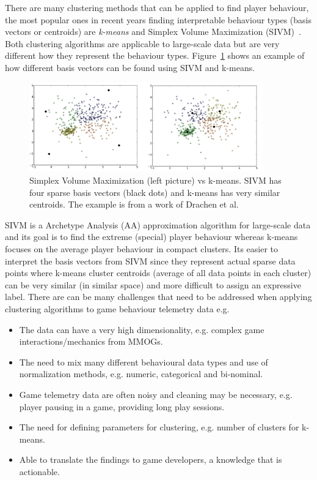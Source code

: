 There are many clustering methods that can be applied to find player behaviour, the most popular ones in recent years finding interpretable behaviour types (basis vectors or centroids) are \textit{k-means} and Simplex Volume Maximization (SIVM)~\citep{Drachen:2012, Drachen:2013}. Both clustering algorithms are applicable to large-scale data but are very different how they represent the behaviour types. Figure~\ref{fig:SIVMvsKmeans} shows an example of how different basis vectors can be found using SIVM and k-means.
\begin{figure}[here]
\centerline{\includegraphics[width=0.9\textwidth]{Figures/SIVMvsKmeans.png}}
\caption{Simplex Volume Maximization (left picture) vs k-means. SIVM has four sparse basis vectors (black dots) and k-means has very similar centroids. The example is from a work of Drachen et al.~\citep{Drachen:2013}}
\label{fig:SIVMvsKmeans}
\end{figure}

SIVM is a Archetype Analysis (AA) approximation algorithm for large-scale data and its goal is to find the extreme (special) player behaviour whereas k-means focuses on the average player behaviour in compact clusters. Its easier to interpret the basis vectors from SIVM since they represent actual sparse data points where k-means cluster centroids (average of all data points in each cluster) can be very similar (in similar space) and more difficult to assign an expressive label. There are can be many challenges that need to be addressed when applying clustering algorithms to game behaviour telemetry data e.g.
\begin{itemize}
\item The data can have a very high dimensionality, e.g. complex game interactions/mechanics from MMOGs.
\item The need to mix many different behavioural data types and use of normalization methods, e.g. numeric, categorical and bi-nominal.
\item Game telemetry data are often noisy and cleaning may be necessary, e.g. player pausing in a game, providing long play sessions.
\item The need for defining parameters for clustering, e.g. number of clusters for k-means.
\item Able to translate the findings to game developers, a knowledge that is actionable.
\end{itemize}

